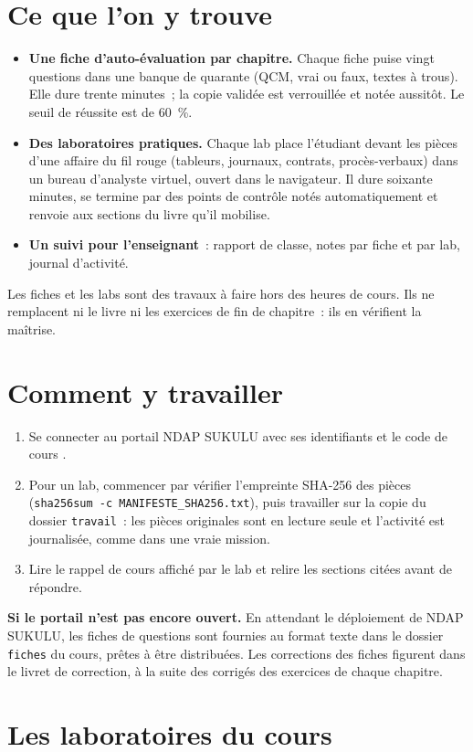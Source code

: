 \section*{Ce que l'on y trouve}

\begin{itemize}
    \item \textbf{Une fiche d'auto-évaluation par chapitre.} Chaque fiche
          puise vingt questions dans une banque de quarante (QCM, vrai ou
          faux, textes à trous). Elle dure trente minutes~; la copie validée
          est verrouillée et notée aussitôt. Le seuil de réussite est de
          60~\%.
    \item \textbf{Des laboratoires pratiques.} Chaque lab place l'étudiant
          devant les pièces d'une affaire du fil rouge (tableurs, journaux,
          contrats, procès-verbaux) dans un bureau d'analyste virtuel,
          ouvert dans le navigateur. Il dure soixante minutes, se termine
          par des points de contrôle notés automatiquement et renvoie aux
          sections du livre qu'il mobilise.
    \item \textbf{Un suivi pour l'enseignant}~: rapport de classe, notes par
          fiche et par lab, journal d'activité.
\end{itemize}

Les fiches et les labs sont des travaux à faire hors des heures de cours.
Ils ne remplacent ni le livre ni les exercices de fin de chapitre~: ils en
vérifient la maîtrise.

\section*{Comment y travailler}

\begin{enumerate}
    \item Se connecter au portail NDAP SUKULU avec ses identifiants et le
          code de cours \textbf{\codeUE}.
    \item Pour un lab, commencer par vérifier l'empreinte SHA-256 des pièces
          (\texttt{sha256sum -c MANIFESTE\_SHA256.txt}), puis travailler sur
          la copie du dossier \texttt{travail}~: les pièces originales sont
          en lecture seule et l'activité est journalisée, comme dans une
          vraie mission.
    \item Lire le rappel de cours affiché par le lab et relire les sections
          citées avant de répondre.
\end{enumerate}

\begin{boxinfo}
\textbf{Si le portail n'est pas encore ouvert.} En attendant le déploiement
de NDAP SUKULU, les fiches de questions sont fournies au format texte dans le
dossier \texttt{fiches} du cours, prêtes à être distribuées. Les corrections
des fiches figurent dans le livret de correction, à la suite des corrigés des
exercices de chaque chapitre.
\end{boxinfo}

\section*{Les laboratoires du cours}


